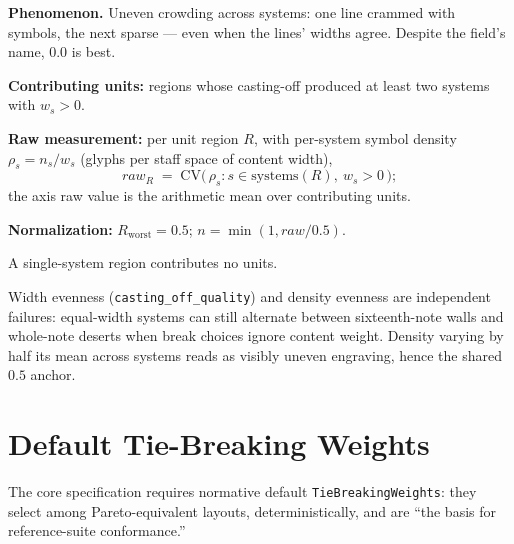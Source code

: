 \documentclass[11pt,letterpaper]{report}
\newcounter{requirement}[chapter]
\begin{document}
\textbf{Phenomenon.} Uneven crowding across systems: one line crammed with
symbols, the next sparse --- even when the lines' widths agree. Despite the
field's name, $0.0$ is best.

\begin{requirement}
\label{req:qmc:symbol-density}
\textbf{Contributing units:} regions whose casting-off produced at least
two systems with $w_s > 0$.

\textbf{Raw measurement:} per unit region $R$, with per-system symbol
density $\rho_s = n_s / w_s$ (glyphs per staff space of content width),
\[
  \mathit{raw}_R \;=\; \mathrm{CV}\bigl(\, \rho_s : s \in \mathrm{systems}(R),\ w_s > 0 \,\bigr);
\]
the axis raw value is the arithmetic mean over contributing units.

\textbf{Normalization:} $R_{\mathrm{worst}} = 0.5$;
$n = \min(1, \mathit{raw} / 0.5)$.

A single-system region contributes no units.
\end{requirement}

\begin{rationale}
Width evenness (\texttt{casting\_off\_quality}) and density evenness are
independent failures: equal-width systems can still alternate between
sixteenth-note walls and whole-note deserts when break choices ignore
content weight. Density varying by half its mean across systems reads as
visibly uneven engraving, hence the shared $0.5$ anchor.
\end{rationale}

\chapter{Default Tie-Breaking Weights}
\label{ch:weights}

The core specification requires normative default
\texttt{TieBreakingWeights}: they select among Pareto-equivalent layouts,
deterministically, and are ``the basis for reference-suite conformance.''
\end{document}

